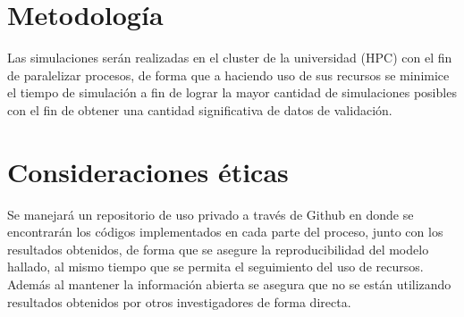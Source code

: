 \section{Metodología}
	Las simulaciones ser\'an realizadas en el cluster de la universidad (HPC) con el fin de paralelizar procesos, de forma que a haciendo uso de sus recursos se minimice el tiempo de simulación a fin de lograr la mayor cantidad de simulaciones posibles con el fin de obtener una cantidad significativa de datos de validación.
	
\section{Consideraciones éticas}
	Se manejará un repositorio de uso privado a través de Github en donde se encontrar\'an los códigos implementados en cada parte del proceso, junto con los resultados obtenidos, de forma que se asegure la reproducibilidad del modelo hallado, al mismo tiempo que se permita el seguimiento del uso de recursos. Adem\'as al mantener la informaci\'on abierta se asegura que no se están utilizando resultados obtenidos por otros investigadores de forma directa.
	
